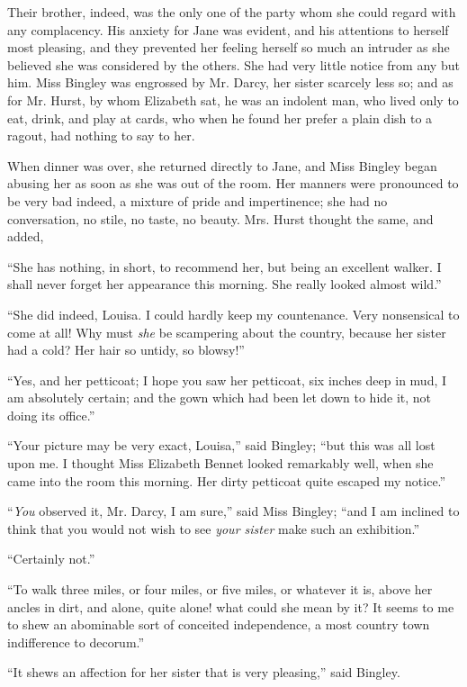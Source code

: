 Their brother, indeed, was the only one of the party
whom she could regard with any complacency. His
anxiety for Jane was evident, and his attentions to herself
most pleasing, and they prevented her feeling herself so
much an intruder as she believed she was considered by
the others. She had very little notice from any but him.
Miss Bingley was engrossed by Mr. Darcy, her sister
scarcely less so; and as for Mr. Hurst, by whom Elizabeth
sat, he was an indolent man, who lived only to eat, drink,
and play at cards, who when he found her prefer a plain
dish to a ragout, had nothing to say to her.

When dinner was over, she returned directly to Jane,
and Miss Bingley began abusing her as soon as she was
out of the room. Her manners were pronounced to be
very bad indeed, a mixture of pride and impertinence;
she had no conversation, no stile, no taste, no beauty.
Mrs. Hurst thought the same, and added,

“She has nothing, in short, to recommend her, but
being an excellent walker. I shall never forget her
appearance this morning. She really looked almost wild.”

“She did indeed, Louisa. I could hardly keep my
countenance. Very nonsensical to come at all! Why
must \textit{she} be scampering about the country, because her
sister had a cold? Her hair so untidy, so blowsy!”

“Yes, and her petticoat; I hope you saw her petticoat,
six inches deep in mud, I am absolutely certain; and the
gown which had been let down to hide it, not doing its
office.”

“Your picture may be very exact, Louisa,” said
Bingley; “but this was all lost upon me. I thought
Miss Elizabeth Bennet looked remarkably well, when she
came into the room this morning. Her dirty petticoat
quite escaped my notice.”

“\textit{You} observed it, Mr. Darcy, I am sure,” said Miss
Bingley; “and I am inclined to think that you would
not wish to see \textit{your sister} make such an exhibition.”

“Certainly not.”

“To walk three miles, or four miles, or five miles, or
whatever it is, above her ancles in dirt, and alone, quite
alone! what could she mean by it? It seems to me
to shew an abominable sort of conceited independence,
a most country town indifference to decorum.”

“It shews an affection for her sister that is very
pleasing,” said Bingley.

